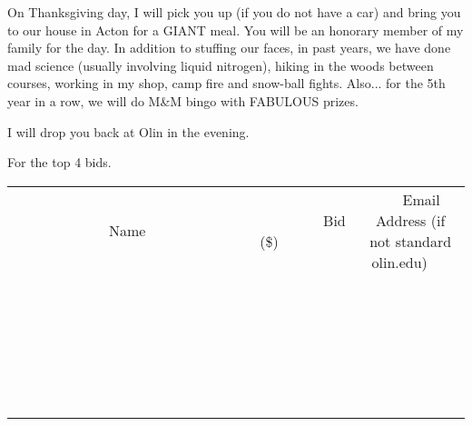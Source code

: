 \documentclass[11pt]{article}
\begin{document}
On Thanksgiving day, I will pick you up (if you do not have a car) and bring you to our house in Acton for a GIANT meal. You will be an honorary member of my  family for the day. In addition to stuffing our faces, in past years, we have done mad science (usually involving liquid nitrogen), hiking in the woods between courses, working in my shop, camp fire and snow-ball fights. Also... for the 5th year in a row, we will do M\&M bingo with FABULOUS prizes. 

I will drop you back at Olin in the evening.

For the top 4 bids. \\[6ex]
\begin{tabular}{c c c}
~~~~~~~~~~~~~Name~~~~~~~~~~~~~ & ~~~~~~~~~Bid (\$)~~~~~~~~~ & ~~~Email Address (if not standard olin.edu)~~~ \\
 & & \\
\hline
 & & \\
\hline
 & & \\
\hline
 & & \\
\hline
 & & \\
\hline
 & & \\
\hline
 & & \\
\hline
 & & \\
\hline
 & & \\
\hline
 & & \\
\hline
 & & \\
\hline
 & & \\
\hline
 & & \\
\hline
 & & \\
\hline
 & & \\
\hline
 & & \\
\hline
 & & \\
\hline
 & & \\
\hline
 & & \\
\hline
 & & \\
\hline
 & & \\
\hline
 & & \\
\hline
 & & \\
\hline
 & & \\
\hline
 & & \\
\hline
 & & \\
\hline
\end{tabular}
\clearpage
\end{document}
